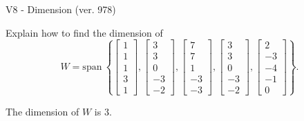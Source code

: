 \begin{exercise}
  \begin{exerciseTitle}V8 - Dimension (ver. 978)\end{exerciseTitle}
  \begin{exerciseStatement}
    Explain how to find the dimension of 
\[W=\mathrm{span}\ \left\{\left[\begin{array}{r}
1 \\
1 \\
1 \\
3 \\
1
\end{array}\right] , \left[\begin{array}{r}
3 \\
3 \\
0 \\
-3 \\
-2
\end{array}\right] , \left[\begin{array}{r}
7 \\
7 \\
1 \\
-3 \\
-3
\end{array}\right] , \left[\begin{array}{r}
3 \\
3 \\
0 \\
-3 \\
-2
\end{array}\right] , \left[\begin{array}{r}
2 \\
-3 \\
-4 \\
-1 \\
0
\end{array}\right]\right\}.\]



  \end{exerciseStatement}
  \begin{exerciseAnswer}
   The dimension of \(W\) is  \(3\).
  


  \end{exerciseAnswer}
\end{exercise}